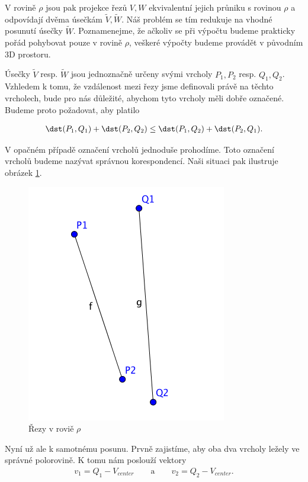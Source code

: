 V rovině $ \rho $ jsou pak projekce řezů $ V, W $ ekvivalentní jejich průniku
s rovinou $ \rho $ a odpovídají dvěma úsečkám $ \widetilde{V}, \widetilde{W} $.
Náš problém se tím redukuje na vhodné posunutí úsečky $ \widetilde{W} $.
Poznamenejme, že ačkoliv se při výpočtu budeme prakticky pořád pohybovat pouze
v rovině $ \rho $, veškeré výpočty budeme provádět v původním 3D prostoru.

Úsečky $ \widetilde{V} $ resp.
$ \widetilde{W} $ jsou jednoznačně určeny svými vrcholy $ P_1, P_2 $ resp. $ Q_1, Q_2 $.
Vzhledem k tomu, že vzdálenost mezi řezy jsme definovali právě na těchto vrcholech,
bude pro nás důležité, abychom tyto vrcholy měli dobře označené. Budeme proto
požadovat, aby platilo

\begin{align*}
    \dst(P_1, Q_1) + \dst(P_2, Q_2) \leq \dst(P_1, Q_2) + \dst(P_2, Q_1).
\end{align*}

V opačném případě označení vrcholů jednoduše prohodíme. Toto označení vrcholů
budeme nazývat správnou korespondencí. Naši situaci pak ilustruje obrázek
\ref{fig:segments_basic}.

\begin{figure}[ht]
    \centering
    \includegraphics{img/segments_basic.png}
    \caption{Řezy v roviě $ \rho $}
  \centering
  \label{fig:segments_basic}
\end{figure}

Nyní už ale k samotnému posunu. Prvně zajistíme, aby oba dva vrcholy ležely ve
správné polorovině. K tomu nám poslouží vektory
\begin{align*}
    v_1 = Q_1 - V_{center} \qquad\text{a}\qquad v_2 = Q_2 - V_{center}.
\end{align*}

